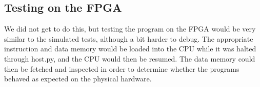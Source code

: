 \subsection{Testing on the FPGA}
We did not get to do this, but testing the program on the FPGA would be very similar to the simulated tests, although a bit harder to debug.
The appropriate instruction and data memory would be loaded into the CPU while it was halted through host.py, and the CPU would then be resumed.
The data memory could then be fetched and inspected in order to determine whether the programs behaved as expected on the physical hardware.
